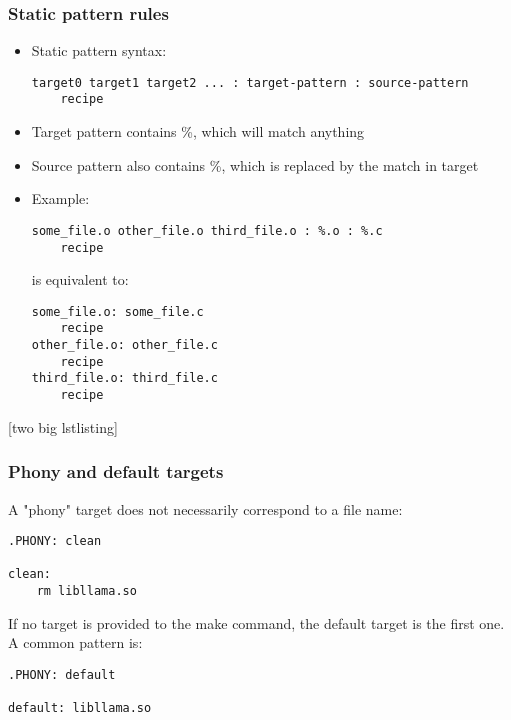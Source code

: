 \documentclass[12pt]{article}
\begin{document}
\subsubsection{Static pattern rules}
\begin{itemize}
    \item Static pattern syntax:
    \begin{lstlisting}
target0 target1 target2 ... : target-pattern : source-pattern
    recipe
    \end{lstlisting}
    
    \item Target pattern contains \%, which will match anything
    \item Source pattern also contains \%, which is replaced by the match in target
    \item Example:
    \begin{lstlisting}
some_file.o other_file.o third_file.o : %.o : %.c
    recipe
    \end{lstlisting}
    is equivalent to:
    \begin{lstlisting}
some_file.o: some_file.c
    recipe
other_file.o: other_file.c
    recipe
third_file.o: third_file.c
    recipe
    \end{lstlisting}
\end{itemize}
[two big lstlisting]

\subsubsection{Phony and default targets}

A "phony" target does not necessarily correspond to a file name:

\begin{lstlisting}
.PHONY: clean

clean:
    rm libllama.so
\end{lstlisting}

If no target is provided to the make command, the default target is the first one. A common pattern is:

\begin{lstlisting}
.PHONY: default

default: libllama.so
\end{lstlisting}
\end{document}
